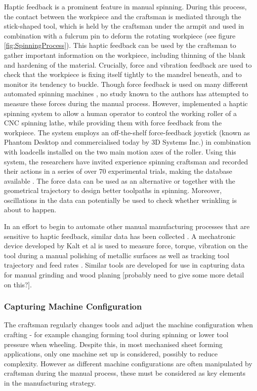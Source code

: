 Haptic feedback is a prominent feature in manual spinning. During this process, the contact between the workpiece and the craftsman is mediated through the stick-shaped tool, which is held by the craftsman under the armpit and used in combination with a fulcrum pin to deform the rotating workpiece (see figure \ref{fig:SpinningProcess}). This haptic feedback can be used by the craftsman to gather important information on the workpiece, including thinning of the blank and hardening of the material. Crucially, force and vibration feedback are used to check that the workpiece is fixing itself tightly to the mandrel beneath, and to monitor its tendency to buckle. Though force feedback is used on many different automated spinning machines \citep{Arai2006Force-controlledMotors}, no study known to the authors has attempted to measure these forces during the manual process. However, \citep{Russo2019HapticSpinning} implemented a haptic spinning system to allow a human operator to control the working roller of a CNC spinning lathe, while providing them with force feedback from the workpiece. The system employs an off-the-shelf force-feedback joystick (known as Phantom Desktop and commercialised today by 3D Systems Inc.) in combination with loadcells installed on the two main motion axes of the roller. Using this system, the researchers have invited experience spinning craftsman and recorded their actions in a series of over 70 experimental trials, making the database available \citep{Russo2020ResearchSpinning}. The force data can be used as an alternative or together with the geometrical trajectory to design better toolpaths in spinning. Moreover, oscillations in the data can potentially be used to check whether wrinkling is about to happen. 

In an effort to begin to automate other manual manufacturing processes that are sensitive to haptic feedback, similar data has been collected . A mechatronic device developed by Kalt et al is used to measure force, torque, vibration on the tool during a manual polishing of metallic surfaces as well as tracking tool trajectory and feed rates \citep{Kalt2016TowardsOperation}. Similar tools are developed for use in capturing data for manual grinding \citep{Phan2018InstrumentationWorkpiece} and wood planing \citep{Montebelli2015OnTasks} [probably need to give some more detail on this?].


\subsubsection{Capturing Machine Configuration}
The craftsman regularly changes tools and adjust the machine configuration when crafting - for example changing forming tool during spinning or lower tool pressure when wheeling. Despite this, in most mechanised sheet forming applications, only one machine set up is considered, possibly to reduce complexity. However as different machine configurations are often manipulated by craftsman during the manual process, these must be considered as key elements in the manufacturing strategy.

